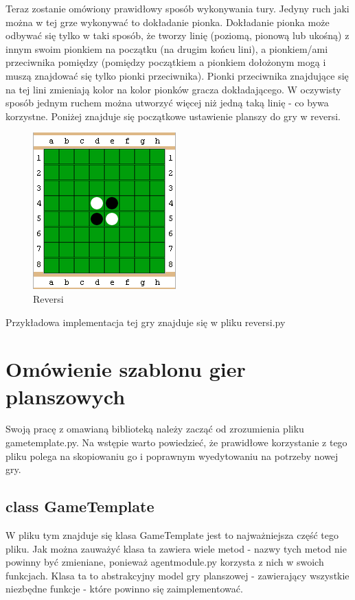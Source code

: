 \documentclass[declaration,shortabstract,inz]{iithesis}
\begin{document}
Teraz zostanie omówiony prawidłowy sposób wykonywania tury.
Jedyny ruch jaki można w tej grze wykonywać to dokładanie pionka.
Dokładanie pionka może odbywać się tylko w taki sposób, że tworzy linię (poziomą, pionową lub ukośną) z innym swoim pionkiem na początku (na drugim końcu lini), a pionkiem/ami przeciwnika pomiędzy (pomiędzy początkiem a pionkiem dołożonym mogą i muszą znajdować się tylko pionki przeciwnika).
Pionki przeciwnika znajdujące się na tej lini zmieniają kolor na kolor pionków gracza dokładającego.
W oczywisty sposób jednym ruchem można utworzyć więcej niż jedną taką linię - co bywa korzystne.
Poniżej znajduje się początkowe ustawienie planszy do gry w reversi.
\begin{figure}[H]
  \includegraphics{./images/reversi.png}
  \centering
  \caption{Reversi}
  \label{fig:reversi}
\end{figure}

Przykładowa implementacja tej gry znajduje się w pliku reversi.py


\section{Omówienie szablonu gier planszowych}
Swoją pracę z omawianą biblioteką należy zacząć od zrozumienia pliku game\textunderscore template.py.
Na wstępie warto powiedzieć, że prawidłowe korzystanie z tego pliku polega na skopiowaniu go i poprawnym wyedytowaniu na potrzeby nowej gry.

\subsection{class GameTemplate}
W pliku tym znajduje się klasa GameTemplate jest to najważniejsza część tego pliku.
Jak można zauważyć klasa ta zawiera wiele metod - nazwy tych metod nie powinny być zmieniane, ponieważ agent\textunderscore module.py korzysta z nich w swoich funkcjach.
Klasa ta to abstrakcyjny model gry planszowej - zawierający wszystkie niezbędne funkcje - które powinno się zaimplementować.
\end{document}
